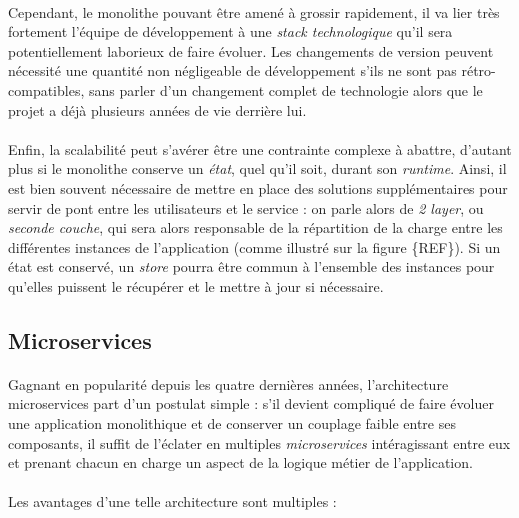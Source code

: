 \paragraph{} Cependant, le monolithe pouvant être amené à grossir rapidement, il va lier très fortement l'équipe de développement
à une \emph{stack technologique} qu'il sera potentiellement laborieux de faire évoluer. Les changements de version peuvent 
nécessité une quantité non négligeable de développement s'ils ne sont pas rétro-compatibles, sans parler d'un changement 
complet de technologie alors que le projet a déjà plusieurs années de vie derrière lui.

\paragraph{} Enfin, la scalabilité peut s'avérer être une contrainte complexe à abattre, d'autant plus si le monolithe
conserve un \emph{état}, quel qu'il soit, durant son \emph{runtime}. Ainsi, il est bien souvent nécessaire de mettre en place
des solutions supplémentaires pour servir de pont entre les utilisateurs et le service : on parle alors de \emph{2 layer},
ou \emph{seconde couche}, qui sera alors responsable de la répartition de la charge entre les différentes instances de l'application
(comme illustré sur la figure \{REF\}). Si un état est conservé, un \emph{store} pourra être commun
à l'ensemble des instances pour qu'elles puissent le récupérer et le mettre à jour si nécessaire.


\subsection*{Microservices}

\paragraph{} Gagnant en popularité depuis les quatre dernières années, l'architecture microservices part d'un postulat
simple : s'il devient compliqué de faire évoluer une application monolithique et de conserver un couplage faible entre ses
composants, il suffit de l'éclater en multiples \emph{microservices} intéragissant entre eux et prenant chacun en charge 
un aspect de la logique métier de l'application.

\paragraph{} Les avantages d'une telle architecture sont multiples :

